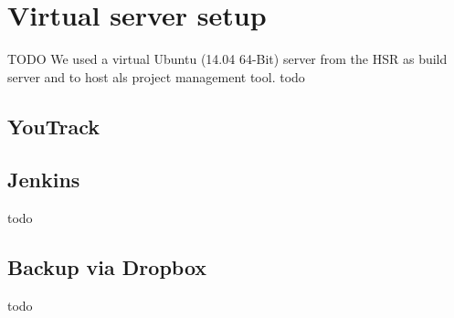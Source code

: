 \section{Virtual server setup}
\label{sec:Virtual server setup}

TODO
We used a virtual Ubuntu (14.04 64-Bit) server from the \acs{HSR} as build
server and to host  als project management tool.
todo

\subsection{YouTrack}


\subsection{Jenkins}
todo

\subsection{Backup via Dropbox}
todo